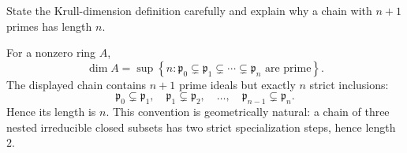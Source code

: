\begin{problem}\label{prob:vi29-01}
State the Krull-dimension definition carefully and explain why a chain with \(n+1\) primes has length \(n\).

\end{problem}

\ifdefined\FullProblemDossiers
\begin{solution}
For a nonzero ring \(A\),
\[
\dim A
=
\sup\left\{
n:
\mathfrak p_0\subsetneq\mathfrak p_1\subsetneq\cdots\subsetneq\mathfrak p_n
\text{ are prime}
\right\}.
\]
The displayed chain contains \(n+1\) prime ideals but exactly \(n\) strict inclusions:
\[
\mathfrak p_0\subsetneq\mathfrak p_1,\quad
\mathfrak p_1\subsetneq\mathfrak p_2,\quad\ldots,\quad
\mathfrak p_{n-1}\subsetneq\mathfrak p_n.
\]
Hence its length is \(n\).  This convention is geometrically natural: a chain
of three nested irreducible closed subsets has two strict specialization steps, hence length \(2\).
\end{solution}
\fi

